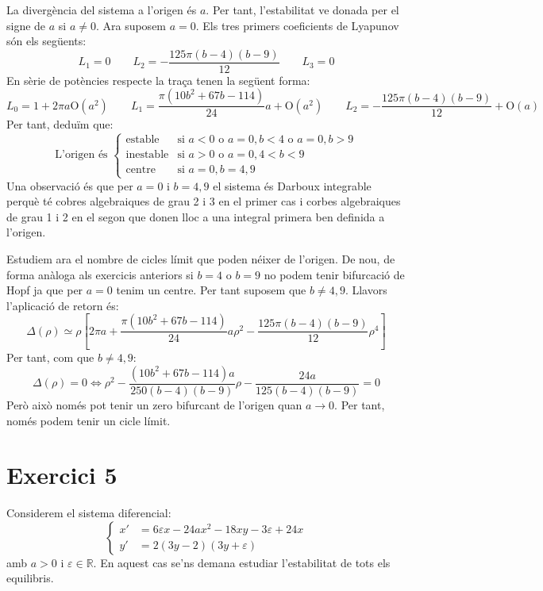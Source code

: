 \documentclass[a4paper]{article}
\newcommand{\RR}{\ensuremath{\mathbb{R}}} %
\newcommand{\OO}{\mathrm{O}}
\theoremstyle{definition}
\begin{document}
La divergència del sistema a l'origen és $a$. Per tant, l'estabilitat ve donada per el signe de $a$ si $a\ne 0$. Ara suposem $a=0$. Els tres primers coeficients de Lyapunov són els següents:
$$L_1=0\qquad L_2=-\frac{125\pi(b-4)(b-9)}{12}\qquad L_3 = 0$$
En sèrie de potències respecte la traça tenen la següent forma:
$$L_0=1+2\pi a \OO(a^2)\qquad L_1=\frac{\pi(10b^2+67b-114)}{24}a+\OO(a^2)\qquad L_2=-\frac{125\pi(b-4)(b-9)}{12} +\OO(a)$$
Per tant, deduïm que:
$$\text{L'origen és }
  \begin{cases}
    \text{estable}   & \text{si } a < 0 \text{ o } a = 0, b<4 \text{ o }  a = 0, b>9 \\
    \text{inestable} & \text{si } a > 0 \text{ o } a = 0, 4<b<9                      \\
    \text{centre}    & \text{si } a = 0, b=4,9
  \end{cases}
$$
Una observació és que per $a = 0$ i $b=4, 9$ el sistema és Darboux integrable perquè té cobres algebraiques de grau 2 i 3 en el primer cas i corbes algebraiques de grau 1 i 2 en el segon que donen lloc a una integral primera ben definida a l'origen.

Estudiem ara el nombre de cicles límit que poden néixer de l'origen. De nou, de forma anàloga als exercicis anteriors si $b=4$ o $b=9$ no podem tenir bifurcació de Hopf ja que per $a=0$ tenim un centre. Per tant suposem que $b\ne 4,9$. Llavors l'aplicació de retorn és:
$$\Delta(\rho)\simeq \rho\left[2\pi a + \frac{\pi(10b^2+67b-114)}{24}a\rho^2-\frac{125\pi(b-4)(b-9)}{12}\rho^4\right]$$
Per tant, com que $b\ne 4,9$:
$$\Delta(\rho)=0\iff \rho^2 - \frac{(10b^2+67b-114)a}{250(b-4)(b-9)}\rho-\frac{24a}{125(b-4)(b-9)} = 0$$
Però això només pot tenir un zero bifurcant de l'origen quan $a\to 0$. Per tant, només podem tenir un cicle límit.

\newpage
\section*{Exercici 5}
Considerem el sistema diferencial:
\begin{equation}\label{sis5}
  \left\{
  \begin{aligned}
    x' & = 6\varepsilon x-24ax^2-18xy-3\varepsilon+24x \\
    y' & =2(3y-2)(3y+\varepsilon)
  \end{aligned}
  \right.
\end{equation}
amb $a>0$ i $\varepsilon\in\RR$. En aquest cas se'ns demana estudiar l'estabilitat de tots els equilibris.
\end{document}

